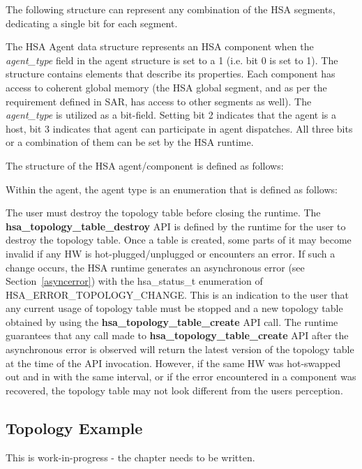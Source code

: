 \documentclass{book}
\newcommand{\reffun}[1]{\textbf{#1}}
\newcommand{\reffld}[1]{\textit{#1}}
\newcommand{\reftyp}[1]{#1}
\newcommand{\refenu}[1]{\reftyp{#1}}
\begin{document}
The following structure can represent any combination of the HSA
segments, dedicating a single bit for each segment.



The HSA Agent data structure represents an HSA component when the
\reffld{agent\_type} field in the agent structure is set to a 1
(i.e. bit 0 is set to 1).
The structure contains elements that describe its properties. Each
component has access to coherent global memory (the HSA global
segment, and as per the requirement defined in SAR, has access to
other segments as well). The \reffld{agent\_type} is utilized as a
bit-field. Setting bit 2 indicates that the agent is a host, bit 3
indicates that agent can participate in agent dispatches. All
three bits or a combination of them can be set by the HSA runtime.

The structure of the HSA agent/component is defined as follows:


Within the agent, the agent type is an enumeration that is defined
as follows:


The user must destroy the topology table before closing the runtime.
The \reffun{hsa\_topology\_table\_destroy} API is defined by the
runtime for the user to destroy the topology table. Once a table is
created, some parts of it may become invalid if any HW is
hot-plugged/unplugged or encounters an error. If such a change
occurs, the HSA runtime generates an asynchronous error (see
Section~\ref{asyncerror}) with the \reftyp{hsa\_status\_t} enumeration
of \refenu{HSA\_ERROR\_TOPOLOGY\_CHANGE}. This is an indication to the
user that any current usage of topology table must be stopped and a
new topology table obtained by using the
\reffun{hsa\_topology\_table\_create} API call. The runtime guarantees
that any call made to \reffun{hsa\_topology\_table\_create} API after
the asynchronous error is observed will return the latest version of
the topology table at the time of the API invocation. However, if
the same HW was hot-swapped out and in with the same interval, or if
the error encountered in a component was recovered, the topology
table may not look different from the users perception.

\hypertarget{topology_example}{} \subsection{Topology Example}
This is {\color{red} work-in-progress} - the chapter needs to be written.
\end{document}
